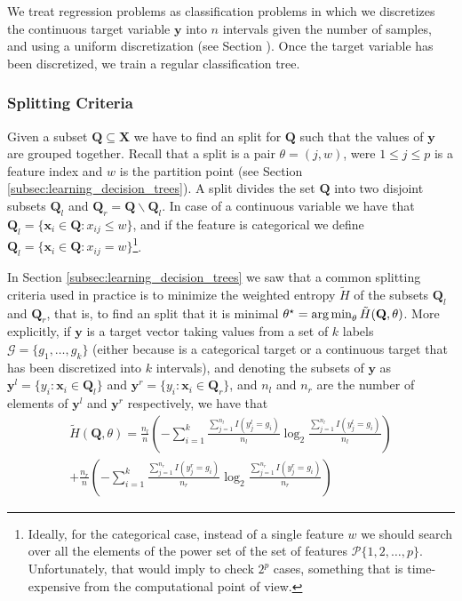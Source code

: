 We treat regression problems as classification problems in which we discretizes the continuous target variable $\mathbf{y}$ into $n$ intervals given the number of samples, and using a uniform discretization (see Section \label{sec:codes_continuous_data}). Once the target variable has been discretized, we train a regular classification tree.

\subsubsection*{Splitting Criteria}
\label{sub:tree_splitting_criteria}

Given a subset $\mathbf{Q} \subseteq \mathbf{X}$ we have to find an split for $\mathbf{Q}$ such that the values of $\textbf{y}$ are grouped together. Recall that a split is a pair $\theta = (j,w)$, were $1 \leq j \leq p$ is a feature index and $w$ is the partition point (see Section \ref{subsec:learning_decision_trees}). A split divides the set $\mathbf{Q}$ into two disjoint subsets $\mathbf{Q}_l$ and $\mathbf{Q}_r = \mathbf{Q} \backslash \mathbf{Q}_l$. In case of a continuous variable we have that $\mathbf{Q}_l = \{\mathbf{x}_i \in \mathbf{Q} : x_{ij} \leq w\}$, and if the feature is categorical we define $\mathbf{Q}_l = \{\mathbf{x}_i \in \mathbf{Q} : x_{ij} = w\}$\footnote{Ideally, for the categorical case, instead of a single feature $w$ we should search over all the elements of the power set of the set of features $\mathcal{P} \{1, 2, \ldots, p \}$. Unfortunately, that would imply to check $2^p$ cases, something that is time-expensive from the computational point of view.}.

In Section \ref{subsec:learning_decision_trees} we saw that a common splitting criteria used in practice is to minimize the weighted entropy $\tilde{H}$ of the subsets $\mathbf{Q}_l$ and $\mathbf{Q}_r$, that is, to find an split that it is minimal $\theta^\star = \operatorname*{arg\,min}_\theta \tilde{H}(\mathbf{Q},\theta)$. More explicitly, if $\mathbf{y}$ is a target vector taking values from a set of $k$ labels $\mathcal{G} = \{g_1, \ldots, g_k \}$ (either because is a categorical target or a continuous target that has been discretized into $k$ intervals), and denoting the subsets of $\mathbf{y}$ as $\mathbf{y}^l = \{y_i : \mathbf{x}_i \in \mathbf{Q}_l \}$ and $\mathbf{y}^r = \{y_i : \mathbf{x}_i \in \mathbf{Q}_r \}$, and $n_l$ and $n_r$ are the number of elements of $\mathbf{y}^l$ and $\mathbf{y}^r$ respectively, we have that
\begin{multline}
\tilde{H}(\mathbf{Q},\theta) = \frac{n_l}{n} \left( - \sum_{i=1}^k \frac{ \sum_{j=1}^{n_l} I(y^l_j = g_i)} {n_l} \log_2{ \frac{ \sum_{j=1}^{n_l} I(y^l_j = g_i)} {n_l} } \right) \\
+ \frac{n_r}{n} \left( - \sum_{i=1}^k \frac{ \sum_{j=1}^{n_r} I(y^r_j = g_i)} {n_r} \log_2{ \frac{ \sum_{j=1}^{n_r} I(y^r_j = g_i)} {n_r} } \right)
\end{multline}

